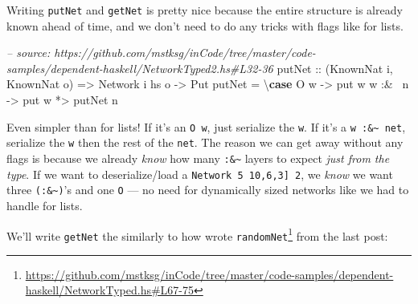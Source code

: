 \documentclass[]{article}
\newenvironment{Shaded}{}{}
\newcommand{\KeywordTok}[1]{\textcolor[rgb]{0.00,0.44,0.13}{\textbf{{#1}}}}
\newcommand{\DataTypeTok}[1]{\textcolor[rgb]{0.56,0.13,0.00}{{#1}}}
\newcommand{\CommentTok}[1]{\textcolor[rgb]{0.38,0.63,0.69}{\textit{{#1}}}}
\newcommand{\OtherTok}[1]{\textcolor[rgb]{0.00,0.44,0.13}{{#1}}}
\newcommand{\FunctionTok}[1]{\textcolor[rgb]{0.02,0.16,0.49}{{#1}}}
\newcommand{\NormalTok}[1]{{#1}}
\renewcommand{\href}[2]{#2\footnote{\url{#1}}}
\begin{document}
Writing \texttt{putNet} and \texttt{getNet} is pretty nice because the entire
structure is already known ahead of time, and we don't need to do any tricks
with flags like for lists.

\begin{Shaded}
\begin{Highlighting}[]
\CommentTok{-- source: https://github.com/mstksg/inCode/tree/master/code-samples/dependent-haskell/NetworkTyped2.hs#L32-36}
\OtherTok{putNet ::} \NormalTok{(}\DataTypeTok{KnownNat} \NormalTok{i, }\DataTypeTok{KnownNat} \NormalTok{o)}
       \OtherTok{=>} \DataTypeTok{Network} \NormalTok{i hs o}
       \OtherTok{->} \DataTypeTok{Put}
\NormalTok{putNet }\FunctionTok{=} \NormalTok{\textbackslash{}}\KeywordTok{case} \DataTypeTok{O} \NormalTok{w     }\OtherTok{->} \NormalTok{put w}
               \NormalTok{w }\FunctionTok{:&~} \NormalTok{n }\OtherTok{->} \NormalTok{put w }\FunctionTok{*>} \NormalTok{putNet n}
\end{Highlighting}
\end{Shaded}

Even simpler than for lists! If it's an \texttt{O\ w}, just serialize the
\texttt{w}. If it's a \texttt{w\ :\&\textasciitilde{}\ net}, serialize the
\texttt{w} then the rest of the \texttt{net}. The reason we can get away without
any flags is because we already \emph{know} how many
\texttt{:\&\textasciitilde{}} layers to expect \emph{just from the type}. If we
want to deserialize/load a
\texttt{Network\ 5\ \textquotesingle{}{[}10,6,3{]}\ 2}, we \emph{know} we want
three \texttt{(:\&\textasciitilde{})}'s and one \texttt{O} --- no need for
dynamically sized networks like we had to handle for lists.

We'll write \texttt{getNet} the similarly to how wrote
\href{https://github.com/mstksg/inCode/tree/master/code-samples/dependent-haskell/NetworkTyped.hs\#L67-75}{\texttt{randomNet}}
from the last post:

\begin{Shaded}
\end{Shaded}
\end{document}
